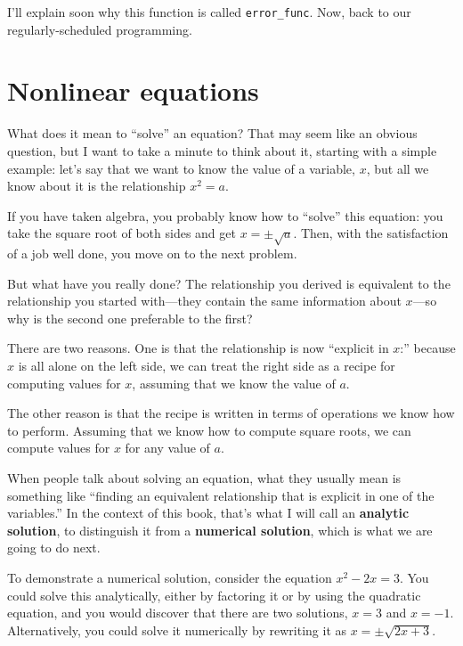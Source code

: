 \documentclass[
]{book}
\begin{document}
I'll explain soon why this function is called {\tt error\_func}.
Now, back to our regularly-scheduled programming.



\section{Nonlinear equations}

What does it mean to ``solve'' an equation?  That may seem like an
obvious question, but I want to take a minute to think about it,
starting with a simple example: let's say that we want to know the
value of a variable, $x$, but all we know about it is the relationship
$x^2 = a$.

If you have taken algebra, you probably know how to ``solve'' this
equation: you take the square root of both sides and get
$x = \pm \sqrt{a}$.  Then, with the satisfaction of a job well done,
you move on to the next problem.

But what have you really done?  The relationship you derived is
equivalent to the relationship you started with---they contain the
same information about $x$---so why is the second one preferable
to the first?

There are two reasons.  One is that the relationship is now ``explicit
in $x$:'' because $x$ is all alone on the left side, we can treat
the right side as a recipe for computing values for $x$, assuming that we
know the value of $a$.

The other reason is that the recipe is written in terms of operations
we know how to perform.  Assuming that we know how to compute square
roots, we can compute values for $x$ for any value of $a$.

When people talk about solving an equation, what they usually mean
is something like ``finding an equivalent relationship that is
explicit in one of the variables.''  In the context of this book,
that's what I will call an {\bf analytic solution}, 
to distinguish
it from a {\bf numerical solution}, 
which is what we are going to
do next.

To demonstrate a numerical solution, consider the equation $x^2 - 2x =
3$.  You could solve this analytically, either by factoring it or by
using the quadratic equation, and you would discover that there are
two solutions, $x=3$ and $x=-1$.  Alternatively, you could solve it
numerically by rewriting it as $x =\pm \sqrt{2x+3}$.
\end{document}
